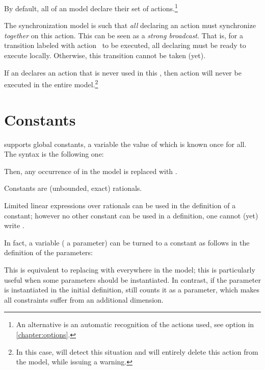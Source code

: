 By default, all \IPTA{} of an \imitator{} model declare their set of actions.\footnote{%
	An alternative is an automatic recognition of the actions used, see option  in \cref{chapter:options}.
}

The \imitator{} synchronization model is such that \emph{all} \IPTA{} declaring an action must synchronize \emph{together} on this action.
This can be seen as a \emph{strong broadcast}.
That is, for a transition labeled with action~ to be executed, all \IPTA{} declaring  must be ready to execute  locally.
Otherwise, this transition cannot be taken (yet).

If an \IPTA{} declares an action  that is never used in this \IPTA{}, then action  will never be executed in the entire model.\footnote{%
	In this case, \imitator{} will detect this situation and will entirely delete this action from the model, while issuing a warning.
}

\section{Constants}

\imitator{} supports global constants, \ie{} a variable the value of which is known once for all.
The syntax is the following one:
\begin{center}
\end{center}
Then, any occurrence of  in the model is replaced with .

Constants are (unbounded, exact) rationals.

Limited linear expressions over rationals can be used in the definition of a constant; however no other constant can be used in a definition, \ie{} one cannot (yet) write .


\begin{hint}
	In fact, a variable (\eg{} a parameter) can be turned to a constant as follows in the definition of the parameters:
	\begin{center}
	\end{center}
	This is equivalent to replacing  with  everywhere in the model; this is particularly useful when some parameters should be instantiated.
	In contrast, if the parameter is instantiated in the initial definition, \imitator{} still counts it as a parameter, which makes all constraints suffer from an additional dimension.
\end{hint}





